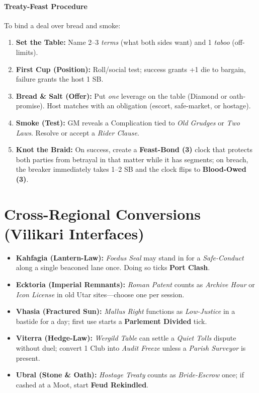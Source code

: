 \paragraph{Treaty-Feast Procedure} To bind a deal over bread and smoke:
\begin{enumerate}
  \item \textbf{Set the Table:} Name 2–3 \emph{terms} (what both sides want) and 1 \emph{taboo} (off-limits).
  \item \textbf{First Cup (Position):} Roll/social test; success grants +1 die to bargain, failure grants the host 1 SB.
  \item \textbf{Bread & Salt (Offer):} Put \emph{one} leverage on the table (Diamond or oath-promise). Host matches with an obligation (escort, safe-market, or hostage).
  \item \textbf{Smoke (Test):} GM reveals a Complication tied to \emph{Old Grudges} or \emph{Two Laws}. Resolve or accept a \emph{Rider Clause}.
  \item \textbf{Knot the Braid:} On success, create a \textbf{Feast-Bond (3)} clock that protects both parties from betrayal in that matter while it has segments; on breach, the breaker immediately takes 1–2 SB and the clock flips to \textbf{Blood-Owed (3)}.
\end{enumerate}
\section*{Cross-Regional Conversions (Vilikari Interfaces)}
\begin{itemize}
\item \textbf{Kahfagia (Lantern-Law):} \emph{Foedus Seal} may stand in for a \emph{Safe-Conduct} along a single beaconed lane once. Doing so ticks \textbf{Port Clash}.
\item \textbf{Ecktoria (Imperial Remnants):} \emph{Roman Patent} counts as \emph{Archive Hour} or \emph{Icon License} in old Utar sites—choose one per session.
\item \textbf{Vhasia (Fractured Sun):} \emph{Mallus Right} functions as \emph{Low-Justice} in a bastide for a day; first use starts a \textbf{Parlement Divided} tick.
\item \textbf{Viterra (Hedge-Law):} \emph{Wergild Table} can settle a \emph{Quiet Tolls} dispute without duel; convert 1 Club into \emph{Audit Freeze} unless a \emph{Parish Surveyor} is present.
\item \textbf{Ubral (Stone \& Oath):} \emph{Hostage Treaty} counts as \emph{Bride-Escrow} once; if cashed at a Moot, start \textbf{Feud Rekindled}.
\end{itemize}
